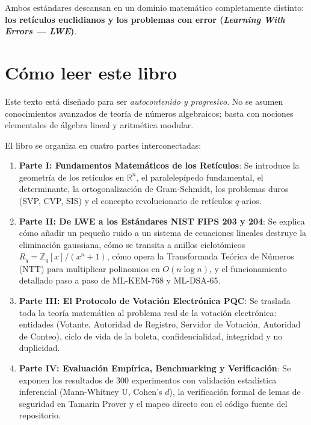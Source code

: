 \documentclass[11pt,a4paper,twoside,openright]{book}
\theoremstyle{plain}
\theoremstyle{definition}
\theoremstyle{remark}
\newcommand{\Zq}{\mathbb{Z}_q}
\newcommand{\R}{\mathbb{R}}
\newcommand{\Rq}{R_q}
\newcommand{\MLKEM}{\textsf{ML-KEM}}
\newcommand{\MLDSA}{\textsf{ML-DSA}}
\begin{document}
Ambos est\'andares descansan en un dominio matem\'atico completamente distinto: \textbf{los ret\'iculos euclidianos y los problemas con error (\emph{Learning With Errors --- LWE})}.

\section*{C\'omo leer este libro}

Este texto est\'a dise\~nado para ser \emph{autocontenido y progresivo}. No se asumen conocimientos avanzados de teor\'ia de n\'umeros algebraicos; basta con nociones elementales de \'algebra lineal y aritm\'etica modular.

El libro se organiza en cuatro partes interconectadas:

\begin{enumerate}
  \item \textbf{Parte I: Fundamentos Matem\'aticos de los Ret\'iculos}: Se introduce la geometr\'ia de los ret\'iculos en $\R^n$, el paralelep\'ipedo fundamental, el determinante, la ortogonalizaci\'on de Gram-Schmidt, los problemas duros (SVP, CVP, SIS) y el concepto revolucionario de ret\'iculos $q$-arios.
  \item \textbf{Parte II: De LWE a los Est\'andares NIST FIPS 203 y 204}: Se explica c\'omo a\~nadir un peque\~no ruido a un sistema de ecuaciones lineales destruye la eliminaci\'on gaussiana, c\'omo se transita a anillos ciclot\'omicos $\Rq = \Zq[x]/(x^n+1)$, c\'omo opera la Transformada Te\'orica de N\'umeros (NTT) para multiplicar polinomios en $O(n\log n)$, y el funcionamiento detallado paso a paso de \MLKEM{}-768 y \MLDSA{}-65.
  \item \textbf{Parte III: El Protocolo de Votaci\'on Electr\'onica PQC}: Se traslada toda la teor\'ia matem\'atica al problema real de la votaci\'on electr\'onica: entidades (Votante, Autoridad de Registro, Servidor de Votaci\'on, Autoridad de Conteo), ciclo de vida de la boleta, confidencialidad, integridad y no duplicidad.
  \item \textbf{Parte IV: Evaluaci\'on Emp\'irica, Benchmarking y Verificaci\'on}: Se exponen los resultados de 300 experimentos con validaci\'on estad\'istica inferencial (Mann-Whitney U, Cohen's $d$), la verificaci\'on formal de lemas de seguridad en Tamarin Prover y el mapeo directo con el c\'odigo fuente del repositorio.
\end{enumerate}
\end{document}
